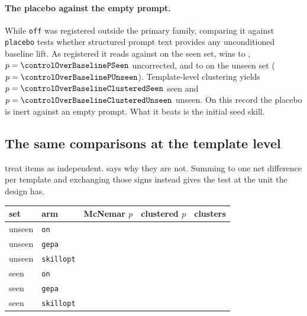 \paragraph{The placebo against the empty prompt.} While \texttt{off} was
registered outside the primary family, comparing it against \texttt{placebo}
tests whether structured prompt text provides any unconditioned baseline lift.
As registered it reads \NUM{\accSeenPlacebo} against \NUM{\accSeenOff} on the
seen set, \NUM{\controlOverBaselineWinsSeen} wins to
\NUM{\controlOverBaselineLossesSeen}, $p = \NUM{\controlOverBaselinePSeen}$
uncorrected, and \NUM{\controlOverBaselineWinsUnseen} to
\NUM{\controlOverBaselineLossesUnseen} on the unseen set ($p = \NUM{\controlOverBaselinePUnseen}$).
Template-level clustering yields $p = \NUM{\controlOverBaselineClusteredSeen}$ seen
and $p = \NUM{\controlOverBaselineClusteredUnseen}$ unseen. On this record the placebo is
inert against an empty prompt. What it beats is the initial seed skill.

\subsection{The same comparisons at the template level}
\label{sec:clustered}

 treat items as independent.  says
why they are not. Summing to one net difference per template and exchanging
those signs instead gives the test at the unit the design has.

\begin{center}
\begin{tabular}{llrrr}
\toprule
set & arm & McNemar $p$ & clustered $p$ & clusters \\
\midrule
unseen & \texttt{on} & \NUM{\pUnseenOn} & \NUM{\clusteredUnseenOn} & \NUM{\clustersUnseenOn} \\
unseen & \texttt{gepa} & \NUM{\pUnseenGepaVsPlaceboGepa} & \NUM{\clusteredUnseenGepaVsPlaceboGepa} & \NUM{\clustersUnseenGepaVsPlaceboGepa} \\
unseen & \texttt{skillopt} & \NUM{\pUnseenSkilloptVsPlaceboSkillopt} & \NUM{\clusteredUnseenSkilloptVsPlaceboSkillopt} & \NUM{\clustersUnseenSkilloptVsPlaceboSkillopt} \\
\midrule
seen & \texttt{on} & \NUM{\pSeenOn} & \NUM{\clusteredSeenOn} & \NUM{\clustersSeenOn} \\
seen & \texttt{gepa} & \NUM{\pSeenGepaVsPlaceboGepa} & \NUM{\clusteredSeenGepaVsPlaceboGepa} & \NUM{\clustersSeenGepaVsPlaceboGepa} \\
seen & \texttt{skillopt} & \NUM{\pSeenSkilloptVsPlaceboSkillopt} & \NUM{\clusteredSeenSkilloptVsPlaceboSkillopt} & \NUM{\clustersSeenSkilloptVsPlaceboSkillopt} \\
\bottomrule
\end{tabular}
\end{center}

